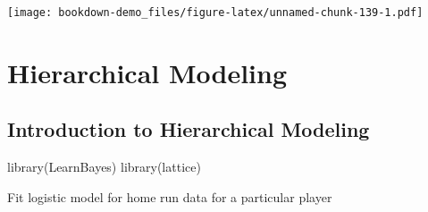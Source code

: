 \documentclass[
]{book}
\newenvironment{Shaded}{\begin{snugshade}}{\end{snugshade}}
\newcommand{\AttributeTok}[1]{\textcolor[rgb]{0.77,0.63,0.00}{#1}}
\newcommand{\ControlFlowTok}[1]{\textcolor[rgb]{0.13,0.29,0.53}{\textbf{#1}}}
\newcommand{\DecValTok}[1]{\textcolor[rgb]{0.00,0.00,0.81}{#1}}
\newcommand{\FunctionTok}[1]{\textcolor[rgb]{0.00,0.00,0.00}{#1}}
\newcommand{\NormalTok}[1]{#1}
\newcommand{\OtherTok}[1]{\textcolor[rgb]{0.56,0.35,0.01}{#1}}
\newcommand{\SpecialCharTok}[1]{\textcolor[rgb]{0.00,0.00,0.00}{#1}}
\begin{document}
\texttt{[image: bookdown-demo\_files/figure-latex/unnamed-chunk-139-1.pdf]}

\hypertarget{hierarchical-modeling}{%
\chapter{Hierarchical Modeling}\label{hierarchical-modeling}}

\hypertarget{introduction-to-hierarchical-modeling}{%
\section{Introduction to Hierarchical Modeling}\label{introduction-to-hierarchical-modeling}}

\begin{Shaded}
\begin{Highlighting}[]
\FunctionTok{library}\NormalTok{(LearnBayes)}
\FunctionTok{library}\NormalTok{(lattice)}
\end{Highlighting}
\end{Shaded}

Fit logistic model for home run data for a particular player

\begin{Shaded}
\end{Shaded}
\end{document}
